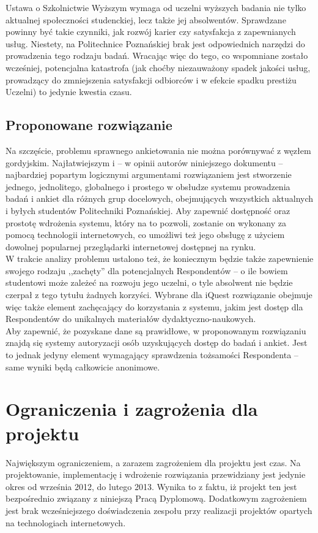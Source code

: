 Ustawa o Szkolnictwie Wyższym wymaga od uczelni wyższych badania nie tylko aktualnej społeczności studenckiej, lecz także jej absolwentów. Sprawdzane powinny być takie czynniki, jak rozwój karier czy satysfakcja z zapewnianych usług. Niestety, na Politechnice Poznańskiej brak jest odpowiednich narzędzi do prowadzenia tego rodzaju badań. Wracając więc do tego, co wspomniane zostało wcześniej, potencjalna katastrofa (jak choćby niezauważony spadek jakości usług, prowadzący do zmniejszenia satysfakcji odbiorców i w efekcie spadku prestiżu Uczelni) to jedynie kwestia czasu. \\

\subsection{Proponowane rozwiązanie}
Na szczęście, problemu sprawnego ankietowania nie można porównywać z węzłem gordyjskim. Najłatwiejszym i -- w opinii autorów niniejszego dokumentu -- najbardziej popartym logicznymi argumentami rozwiązaniem jest stworzenie jednego, jednolitego, globalnego i prostego w obsłudze systemu prowadzenia badań i ankiet dla różnych grup docelowych, obejmujących wszystkich aktualnych i byłych studentów Politechniki Poznańskiej. Aby zapewnić dostępność oraz prostotę wdrożenia systemu, który na to pozwoli, zostanie on wykonany za pomocą technologii internetowych, co umożliwi też jego obsługę z użyciem dowolnej popularnej przeglądarki internetowej dostępnej na rynku. \\

W trakcie analizy problemu ustalono też, że koniecznym będzie także zapewnienie swojego rodzaju ,,zachęty'' dla potencjalnych Respondentów -- o ile bowiem studentowi może zależeć na rozwoju jego uczelni, o tyle absolwent nie będzie czerpał z tego tytułu żadnych korzyści. Wybrane dla iQuest rozwiązanie obejmuje więc także element zachęcający do korzystania z systemu, jakim jest dostęp dla Respondentów do unikalnych materiałów dydaktyczno-naukowych. \\

Aby zapewnić, że pozyskane dane są prawidłowe, w proponowanym rozwiązaniu znajdą się systemy autoryzacji osób uzyskujących dostęp do badań i ankiet. Jest to jednak jedyny element wymagający sprawdzenia tożsamości Respondenta -- same wyniki będą całkowicie anonimowe. \\

\section{Ograniczenia i zagrożenia dla projektu}
Największym ograniczeniem, a zarazem zagrożeniem dla projektu jest czas. Na projektowanie, implementację i wdrożenie rozwiązania przewidziany jest jedynie okres od września 2012, do lutego 2013. Wynika to z faktu, iż projekt ten jest bezpośrednio związany z niniejszą Pracą Dyplomową. Dodatkowym zagrożeniem jest brak wcześniejszego doświadczenia zespołu przy realizacji projektów opartych na technologiach internetowych.

